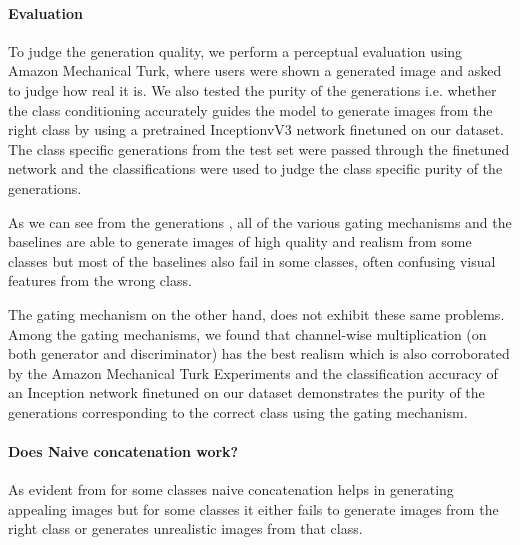 

\paragraph{Evaluation}
To judge the generation quality, we perform a perceptual evaluation using Amazon Mechanical Turk, where users were shown a generated image and asked to judge how real it is.
We also tested the purity of the generations i.e. whether the class conditioning accurately guides the model to generate images from the right class by using a pretrained InceptionvV3 network finetuned on our dataset. 
The class specific generations from the test set were passed through the finetuned network and the classifications were used to judge the class specific purity of the generations.

As we can see from the generations , all of the various gating mechanisms and the baselines are able to generate images of high quality and realism from some classes but most of the baselines also fail in some classes, often confusing visual features from the wrong class. 

The gating mechanism on the other hand, does not exhibit these same problems. 
Among the gating mechanisms, we found that channel-wise multiplication (on both generator and discriminator) has the best realism which is also corroborated by the Amazon Mechanical Turk Experiments and the classification accuracy of an Inception network finetuned on our dataset demonstrates the purity of the generations corresponding to the correct class using the gating mechanism.  
\paragraph{Does Naive concatenation work?} As evident from  for some classes naive concatenation helps in generating appealing images but for some classes it either fails to generate images from the right class or generates unrealistic images from that class.

